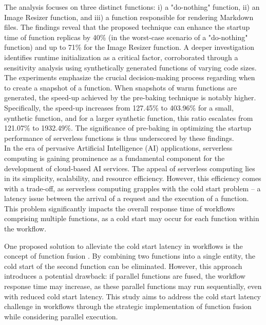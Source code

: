 The analysis focuses on three distinct functions: i) a "do-nothing" function, ii) an Image Resizer function, and iii) a function responsible for rendering Markdown files. The findings reveal that the proposed technique can enhance the startup time of function replicas by 40\% (in the worst-case scenario of a "do-nothing" function) and up to 71\% for the Image Resizer function. A deeper investigation identifies runtime initialization as a critical factor, corroborated through a sensitivity analysis using synthetically generated functions of varying code sizes.\\

The experiments emphasize the crucial decision-making process regarding when to create a snapshot of a function. When snapshots of warm functions are generated, the speed-up achieved by the pre-baking technique is notably higher. Specifically, the speed-up increases from 127.45\% to 403.96\% for a small, synthetic function, and for a larger synthetic function, this ratio escalates from 121.07\% to 1932.49\%. The significance of pre-baking in optimizing the startup performance of serverless functions is thus underscored by these findings.\\

In the era of pervasive Artificial Intelligence (AI) applications, serverless computing is gaining prominence as a fundamental component for the development of cloud-based AI services. The appeal of serverless computing lies in its simplicity, scalability, and resource efficiency. However, this efficiency comes with a trade-off, as serverless computing grapples with the cold start problem – a latency issue between the arrival of a request and the execution of a function. This problem significantly impacts the overall response time of workflows comprising multiple functions, as a cold start may occur for each function within the workflow.

One proposed solution to alleviate the cold start latency in workflows is the concept of function fusion \cite{LYYO21}. By combining two functions into a single entity, the cold start of the second function can be eliminated. However, this approach introduces a potential drawback: if parallel functions are fused, the workflow response time may increase, as these parallel functions may run sequentially, even with reduced cold start latency. This study aims to address the cold start latency challenge in workflows through the strategic implementation of function fusion while considering parallel execution.

